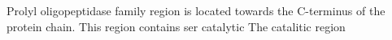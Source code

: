 Prolyl oligopeptidase family region is located towards the C-terminus of the protein chain. This region contains ser catalytic The catalitic region 